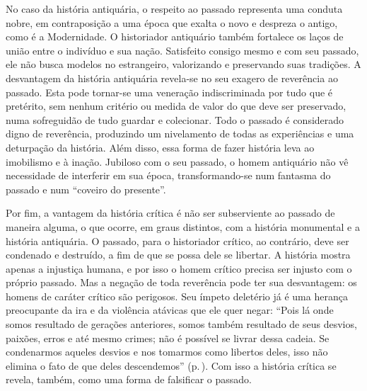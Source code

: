 No caso da história antiquária, o respeito ao passado representa uma
conduta nobre, em contraposição a uma época que exalta o novo e despreza
o antigo, como é a Modernidade. O historiador antiquário também
fortalece os laços de união entre o indivíduo e sua nação. Satisfeito
consigo mesmo e com seu passado, ele não busca modelos no estrangeiro,
valorizando e preservando suas tradições. A desvantagem da história
antiquária revela-se no seu exagero de reverência ao passado. Esta pode
tornar-se uma veneração indiscriminada por tudo que é pretérito, sem
nenhum critério ou medida de valor do que deve ser preservado, numa
sofreguidão de tudo guardar e colecionar. Todo o passado é considerado
digno de reverência, produzindo um nivelamento de todas as experiências
e uma deturpação da história. Além disso, essa forma de fazer história
leva ao imobilismo e à inação. Jubiloso com o seu passado, o homem
antiquário não vê necessidade de interferir em sua época,
transformando-se num fantasma do passado e num ``coveiro do presente''.

Por fim, a vantagem da história crítica é não ser subserviente ao
passado de maneira alguma, o que ocorre, em graus distintos, com a
história monumental e a história antiquária. O passado, para o historiador
crítico, ao contrário, deve ser condenado e destruído, a fim de que se
possa dele se libertar. A história mostra apenas a injustiça humana, e
por isso o homem crítico precisa ser injusto com o próprio passado. Mas
a negação de toda reverência pode ter sua desvantagem: os homens de
caráter crítico são perigosos. Seu ímpeto deletério já é uma herança
preocupante da ira e da violência atávicas que ele quer negar: ``Pois lá
onde somos resultado de gerações anteriores, somos também resultado de
seus desvios, paixões, erros e até mesmo crimes; não é possível se
livrar dessa cadeia. Se condenarmos aqueles desvios e nos tomarmos como
libertos deles, isso não elimina o fato de que deles descendemos'' (p.\,\pageref{delesdescendemos}).
Com isso a história crítica se revela, também, como uma forma de
falsificar o passado.

